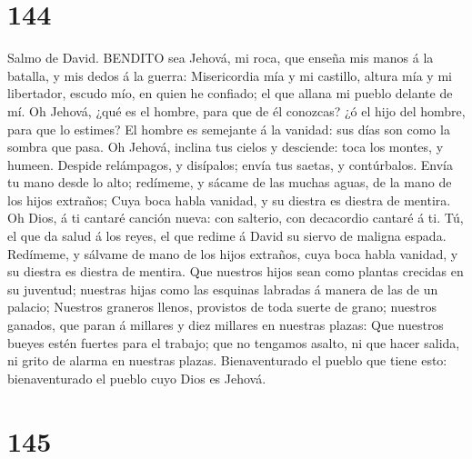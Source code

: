\hypertarget{section-143}{%
\section{144}\label{section-143}}

 Salmo de David. BENDITO sea Jehová, mi roca, que enseña mis
manos á la batalla, y mis dedos á la guerra:  Misericordia
mía y mi castillo, altura mía y mi libertador, escudo mío, en quien he
confiado; el que allana mi pueblo delante de mí.  Oh Jehová,
¿qué es el hombre, para que de él conozcas? ¿ó el hijo del hombre, para
que lo estimes?  El hombre es semejante á la vanidad: sus
días son como la sombra que pasa.  Oh Jehová, inclina tus
cielos y desciende: toca los montes, y humeen.  Despide
relámpagos, y disípalos; envía tus saetas, y contúrbalos. 
Envía tu mano desde lo alto; redímeme, y sácame de las muchas aguas, de
la mano de los hijos extraños;  Cuya boca habla vanidad, y
su diestra es diestra de mentira.  Oh Dios, á ti cantaré
canción nueva: con salterio, con decacordio cantaré á ti. 
Tú, el que da salud á los reyes, el que redime á David su siervo de
maligna espada.  Redímeme, y sálvame de mano de los hijos
extraños, cuya boca habla vanidad, y su diestra es diestra de mentira.
 Que nuestros hijos sean como plantas crecidas en su
juventud; nuestras hijas como las esquinas labradas á manera de las de
un palacio;  Nuestros graneros llenos, provistos de toda
suerte de grano; nuestros ganados, que paran á millares y diez millares
en nuestras plazas:  Que nuestros bueyes estén fuertes para
el trabajo; que no tengamos asalto, ni que hacer salida, ni grito de
alarma en nuestras plazas.  Bienaventurado el pueblo que
tiene esto: bienaventurado el pueblo cuyo Dios es Jehová.

\hypertarget{section-144}{%
\section{145}\label{section-144}}

